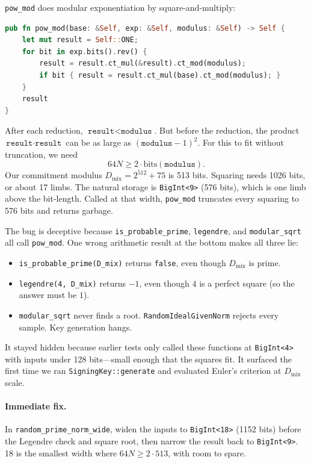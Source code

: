 \texttt{pow\_mod} does modular exponentiation by square-and-multiply:
\begin{lstlisting}[language=Rust]
pub fn pow_mod(base: &Self, exp: &Self, modulus: &Self) -> Self {
    let mut result = Self::ONE;
    for bit in exp.bits().rev() {
        result = result.ct_mul(&result).ct_mod(modulus);
        if bit { result = result.ct_mul(base).ct_mod(modulus); }
    }
    result
}
\end{lstlisting}
After each reduction, $\texttt{result} < \texttt{modulus}$.  But
before the reduction, the product $\texttt{result} \cdot
\texttt{result}$ can be as large as $(\texttt{modulus}-1)^2$.  For
this to fit without truncation, we need
\[
    64N \geq 2 \cdot \mathrm{bits}(\texttt{modulus}).
\]
Our commitment modulus $D_{\mathrm{mix}} = 2^{512} + 75$ is 513 bits.
Squaring needs 1026 bits, or about 17 limbs.  The natural storage is
\texttt{BigInt<9>} (576 bits), which is one limb above the
bit-length.  Called at that width, \texttt{pow\_mod} truncates every
squaring to 576 bits and returns garbage.

The bug is deceptive because \texttt{is\_probable\_prime},
\texttt{legendre}, and \texttt{modular\_sqrt} all call
\texttt{pow\_mod}.  One wrong arithmetic result at the bottom makes
all three lie:
\begin{itemize}
  \item \texttt{is\_probable\_prime(D\_mix)} returns \texttt{false},
    even though $D_{\mathrm{mix}}$ is prime.
  \item \texttt{legendre(4, D\_mix)} returns $-1$, even though $4$ is
    a perfect square (so the answer must be $1$).
  \item \texttt{modular\_sqrt} never finds a root.
    \texttt{RandomIdealGivenNorm} rejects every sample.  Key
    generation hangs.
\end{itemize}

It stayed hidden because earlier tests only called these functions at
\texttt{BigInt<4>} with inputs under 128 bits---small enough that the
squares fit.  It surfaced the first time we ran
\texttt{SigningKey::generate} and evaluated Euler's criterion at
$D_{\mathrm{mix}}$ scale.

\paragraph{Immediate fix.}
In \texttt{random\_prime\_norm\_wide}, widen the inputs to
\texttt{BigInt<18>} (1152 bits) before the Legendre check and square
root, then narrow the result back to \texttt{BigInt<9>}.  18 is the
smallest width where $64N \geq 2 \cdot 513$, with room to spare.

